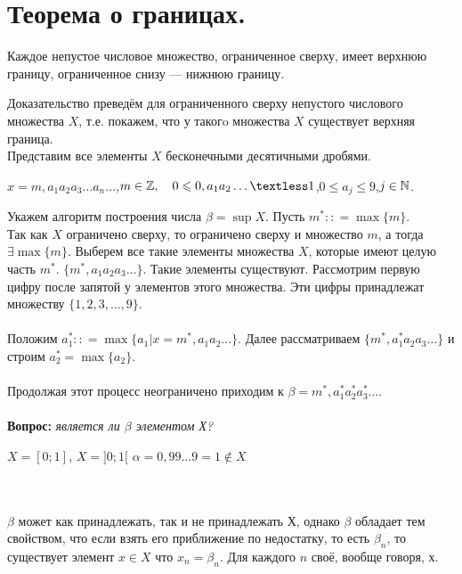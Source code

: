 \section{Теорема о границах.}
\begin{theorem}
	Каждое непустое числовое множество, ограниченное сверху, имеет верхнюю границу, ограниченное снизу --- нижнюю границу.
\end{theorem}
\begin{Proof}
	Доказательство преведём для ограниченного сверху непустого числового множества $X$, т.е. покажем, что у такогo множества $X$ существует верхняя граница.\\
	Представим все элементы $X$ бесконечными десятичными дробями.
	\begin{center}
		$x = m, a_1a_2a_3 \dotsc a_n \dotsc$,\quad $m \in \Z,\quad 0 \leq 0, a_1a_2 \dotsc \textless 1$,\quad $0 \leq a_j \leq 9$,\quad $j \in \mathbb{N}$.
	\end{center}
	Укажем алгоритм построения числа $\beta = \sup X$. Пусть $m^*:: = \max \{m\}$.\\
	Так как $X$ ограничено сверху, то ограничено сверху и множество ${m}$, а тогда $\exists \max\{m\}$.
	Выберем все такие элементы множества $X$, которые имеют целую часть $m^*$.
	$\{m^*,a_1a_2a_3\dotsc\}$. Такие элементы существуют. Рассмотрим первую цифру после запятой у элементов этого множества. Эти цифры принадлежат множеству $\{1, 2, 3, \dotsc, 9\}$.\\\\
	Положим $a_1^*:: = \max \{a_1 | x=m^*,a_1a_2\dotsc\}$. Далее рассматриваем $\{m^*,a_1^*a_2a_3\dotsc\}$ и строим $a_2^*= \max\{a_2\}$.\\\\
	Продолжая этот процесс неограничено приходим к $\beta = m^*,a_1^*a_2^*a_3^*\dots.$\\\\
	\textbf{Вопрос:} \textit{является ли $\beta$ элементом Х?}\\
	\begin{example}
		$X = [0;1]$, $X=]0;1[$ $\alpha = 0,99\dotsc 9 = 1 \notin X$
	\end{example}\\\\
	$\beta$ может как принадлежать, так и не принадлежать Х, однако $\beta$ обладает тем свойством, что если взять его приближение по недостатку, то есть $\beta_n$, то существует элемент $x \in X$ что $x_n = \beta_n$. Для каждого $n$ своё, вообще говоря, $х$.\\\\

\end{Proof}
